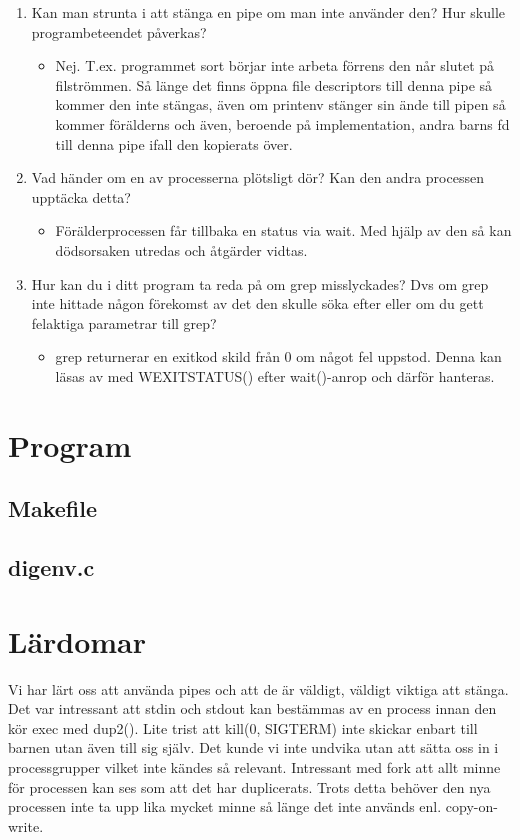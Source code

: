 \documentclass[a4paper,11pt]{article}
\begin{document}
\begin{enumerate}
\begin{itemize}
	\end{itemize}
	\item Kan man strunta i att stänga en pipe om man inte använder den? Hur skulle programbeteendet påverkas?
	\begin{itemize}
		\item Nej. T.ex. programmet sort börjar inte arbeta förrens den når slutet på filströmmen. Så länge det finns öppna file descriptors till denna pipe så kommer den inte stängas, även om printenv stänger sin ände till pipen så kommer förälderns och även, beroende på implementation, andra barns fd till denna pipe ifall den kopierats över.
	\end{itemize}
	\item Vad händer om en av processerna plötsligt dör? Kan den andra processen upptäcka detta?
	\begin{itemize}
		\item Förälderprocessen får tillbaka en status via wait. Med hjälp av den så kan dödsorsaken utredas och åtgärder vidtas.
	\end{itemize}
	\item Hur kan du i ditt program ta reda på om grep misslyckades? Dvs om grep inte hittade någon förekomst av det den skulle söka efter eller om du gett felaktiga parametrar till grep?
	\begin{itemize}
		\item grep returnerar en exitkod skild från 0 om något fel uppstod. Denna kan läsas av med WEXITSTATUS() efter wait()-anrop och därför hanteras.
	\end{itemize}
\end{enumerate}

\section*{Program}

\subsection*{Makefile}


\subsection*{digenv.c}


\section*{Lärdomar}

Vi har lärt oss att använda pipes och att de är väldigt, väldigt viktiga att stänga. Det var intressant att stdin och stdout kan bestämmas av en process innan den kör exec med dup2(). Lite trist att kill(0, SIGTERM) inte skickar enbart till barnen utan även till sig själv. Det kunde vi inte undvika utan att sätta oss in i processgrupper vilket inte kändes så relevant. Intressant med fork att allt minne för processen kan ses som att det har duplicerats. Trots detta behöver den nya processen inte ta upp lika mycket minne så länge det inte används enl. copy-on-write.
\end{document}
